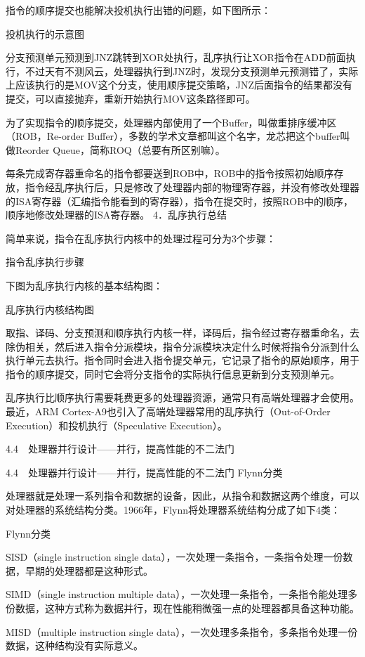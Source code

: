 \documentclass[12pt,UTF8]{ctexbook}
\begin{document}
指令的顺序提交也能解决投机执行出错的问题，如下图所示：

投机执行的示意图

分支预测单元预测到JNZ跳转到XOR处执行，乱序执行让XOR指令在ADD前面执行，不过天有不测风云，处理器执行到JNZ时，发现分支预测单元预测错了，实际上应该执行的是MOV这个分支，使用顺序提交策略，JNZ后面指令的结果都没有提交，可以直接抛弃，重新开始执行MOV这条路径即可。

为了实现指令的顺序提交，处理器内部使用了一个Buffer，叫做重排序缓冲区（ROB，Re-order Buffer），多数的学术文章都叫这个名字，龙芯把这个buffer叫做Reorder Queue，简称ROQ（总要有所区别嘛）。

每条完成寄存器重命名的指令都要送到ROB中，ROB中的指令按照初始顺序存放，指令经乱序执行后，只是修改了处理器内部的物理寄存器，并没有修改处理器的ISA寄存器（汇编指令能看到的寄存器），指令在提交时，按照ROB中的顺序，顺序地修改处理器的ISA寄存器。
4．乱序执行总结

简单来说，指令在乱序执行内核中的处理过程可分为3个步骤：

指令乱序执行步骤

下图为乱序执行内核的基本结构图：

乱序执行内核结构图

取指、译码、分支预测和顺序执行内核一样，译码后，指令经过寄存器重命名，去除伪相关，然后进入指令分派模块，指令分派模块决定什么时候将指令分派到什么执行单元去执行。指令同时会进入指令提交单元，它记录了指令的原始顺序，用于指令的顺序提交，同时它会将分支指令的实际执行信息更新到分支预测单元。

乱序执行比顺序执行需要耗费更多的处理器资源，通常只有高端处理器才会使用。最近，ARM Cortex-A9也引入了高端处理器常用的乱序执行（Out-of-Order Execution）和投机执行（Speculative Execution）。


4.4　处理器并行设计——并行，提高性能的不二法门


4.4　处理器并行设计——并行，提高性能的不二法门
Flynn分类

处理器就是处理一系列指令和数据的设备，因此，从指令和数据这两个维度，可以对处理器的系统结构分类。1966年，Flynn将处理器系统结构分成了如下4类：

Flynn分类

SISD（single instruction single data），一次处理一条指令，一条指令处理一份数据，早期的处理器都是这种形式。

SIMD（single instruction multiple data），一次处理一条指令，一条指令能处理多份数据，这种方式称为数据并行，现在性能稍微强一点的处理器都具备这种功能。

MISD（multiple instruction single data），一次处理多条指令，多条指令处理一份数据，这种结构没有实际意义。
\end{document}
